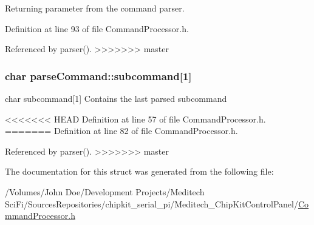 Returning parameter from the command parser. 



Definition at line 93 of file Command\-Processor.\-h.



Referenced by parser().
>>>>>>> master

\hypertarget{structparse_command_a10312bf6b72a9315a4fb550458bc3ae9}{
\subsubsection[{subcommand}]{\setlength{\rightskip}{0pt plus 5cm}char parse\-Command\-::subcommand\mbox{[}1\mbox{]}}}\label{structparse_command_a10312bf6b72a9315a4fb550458bc3ae9}


char subcommand\mbox{[}1\mbox{]} Contains the last parsed subcommand 



<<<<<<< HEAD
Definition at line 57 of file Command\-Processor.\-h.
=======
Definition at line 82 of file Command\-Processor.\-h.



Referenced by parser().
>>>>>>> master



The documentation for this struct was generated from the following file\-:\begin{DoxyCompactItemize}
\item 
/\-Volumes/\-John Doe/\-Development Projects/\-Meditech Sci\-Fi/\-Sources\-Repositories/chipkit\-\_\-serial\-\_\-pi/\-Meditech\-\_\-\-Chip\-Kit\-Control\-Panel/\hyperlink{_command_processor_8h}{Command\-Processor.\-h}\end{DoxyCompactItemize}
